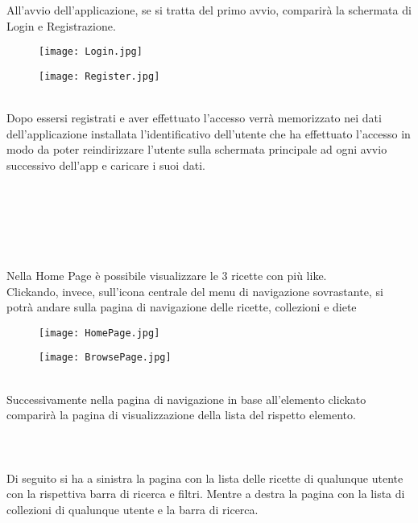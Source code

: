 ﻿\documentclass[a4paper,12pt]{report}
\begin{document}
All'avvio dell'applicazione, se si tratta del primo avvio, comparirà la schermata di Login e Registrazione.
\begin{figure}[h!]
    \begin{minipage}{.5\textwidth}
        \centering
        \texttt{[image: Login.jpg]}
    \end{minipage}
    \begin{minipage}{.5\textwidth}
        \centering
        \texttt{[image: Register.jpg]}
    \end{minipage}
\end{figure}
\\Dopo essersi registrati e aver effettuato l'accesso verrà memorizzato nei dati dell'applicazione installata l'identificativo dell'utente che ha effettuato l'accesso in modo da poter reindirizzare l'utente sulla schermata principale ad ogni avvio successivo dell'app e caricare i suoi dati.
\\\\\\\\\\\\\\Nella Home Page è possibile visualizzare le 3 ricette con più like.
\\Clickando, invece, sull'icona centrale del menu di navigazione sovrastante, si potrà andare sulla pagina di navigazione delle ricette, collezioni e diete
\begin{figure}[h!]
    \begin{minipage}{.5\textwidth}
        \centering
        \texttt{[image: HomePage.jpg]}
    \end{minipage}
    \begin{minipage}{.5\textwidth}
        \centering
        \texttt{[image: BrowsePage.jpg]}
    \end{minipage}
\end{figure}
\\Successivamente nella pagina di navigazione in base all'elemento clickato comparirà la pagina di visualizzazione della lista del rispetto elemento.
\\\\\\\\Di seguito si ha a sinistra la pagina con la lista delle ricette di qualunque utente con la rispettiva barra di ricerca e filtri.
Mentre a destra la pagina con la lista di collezioni di qualunque utente e la barra di ricerca.
\end{document}
